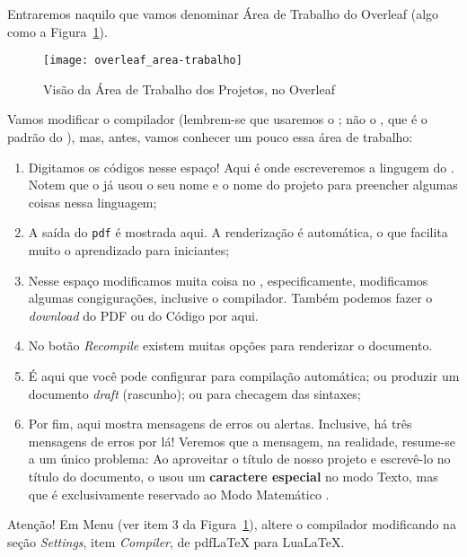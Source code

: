 Entraremos naquilo que vamos denominar {\sffamily Área de Trabalho do Overleaf}
(algo como a Figura~\ref{fig:overleaf_desktop}).

\begin{figure}[!htbp]
  \centering
  \texttt{[image: overleaf\_area-trabalho]}
  \caption{Visão da Área de Trabalho dos Projetos, no Overleaf}
  \label{fig:overleaf_desktop}
\end{figure}

Vamos modificar o compilador (lembrem-se que usaremos o \lualatex; não o 
\pdflatex{}, que é o padrão do \Overleaf), mas, antes, vamos conhecer 
um pouco essa área de trabalho:

\begin{enumerate}
  \item Digitamos os códigos nesse espaço! 
        Aqui é onde escreveremos a lingugem do .
        Notem que o \Overleaf{} já usou o seu nome e o nome do projeto para 
        preencher algumas coisas nessa linguagem;
  \item A saída do \texttt{pdf} é mostrada aqui.
        A renderização é automática, o que facilita muito o aprendizado para 
        iniciantes;
  \item Nesse espaço modificamos muita coisa no \Overleaf{}, especificamente, 
        modificamos algumas congigurações, inclusive o \textsf{compilador}.
        Também podemos fazer o \textit{download} do PDF ou do Código por aqui.
  \item No botão \textit{Recompile} existem muitas opções para renderizar o 
        documento.
  \item É aqui que você pode configurar para compilação automática; ou produzir
        um documento \textit{draft} (rascunho); ou para checagem das sintaxes;
  \item Por fim, aqui mostra mensagens de erros ou alertas. 
        Inclusive, há três mensagens de erros por lá! 
        Veremos que a mensagem, na realidade, resume-se a um único problema: 
        Ao aproveitar o título de nosso projeto e escrevê-lo no título do 
        documento, o \Overleaf{} usou um \textbf{caractere especial} no modo 
        \textsf{Texto}, mas que é exclusivamente reservado ao 
        \textsf{Modo Matemático} .
\end{enumerate}

\begin{atencao}{Atenção!}{\exclamacao}
  Em \textsf{Menu} (ver item 3 da Figura~\ref{fig:overleaf_desktop}), altere o
  compilador modificando na seção \textit{Settings}, item \textit{Compiler}, de
  \textsf{pdfLaTeX} para \textsf{LuaLaTeX}.
\end{atencao}


